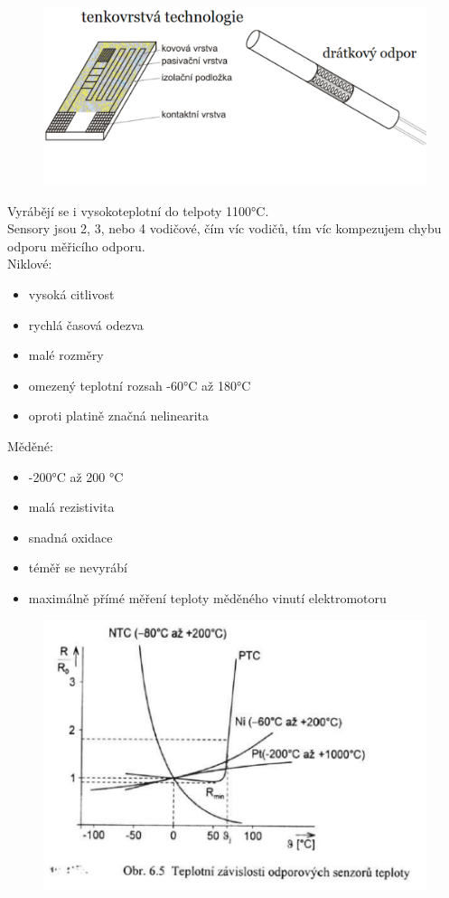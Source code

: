 \begin{figure}[H]
    \includegraphics*[scale = 0.25]{img/odporoveSnimacePlatina.png}
\end{figure}
Vyrábějí se i vysokoteplotní do telpoty 1100°C.\\
Sensory jsou 2, 3, nebo 4 vodičové, čím víc vodičů, tím víc kompezujem chybu odporu měřicího odporu.\\

Niklové:
\begin{itemize}
    \item vysoká citlivost
    \item rychlá časová odezva
    \item malé rozměry
    \item omezený teplotní rozsah -60°C až 180°C
    \item oproti platině značná nelinearita
\end{itemize}

Měděné:
\begin{itemize}
    \item -200°C až 200 °C
    \item malá rezistivita
    \item snadná oxidace
    \item téměř se nevyrábí
    \item maximálně přímé měření teploty měděného vinutí elektromotoru
\end{itemize}
\begin{figure}[H]
    \includegraphics*[scale = 0.7]{img/odporoveSnimaceGrafy.png}
\end{figure}

